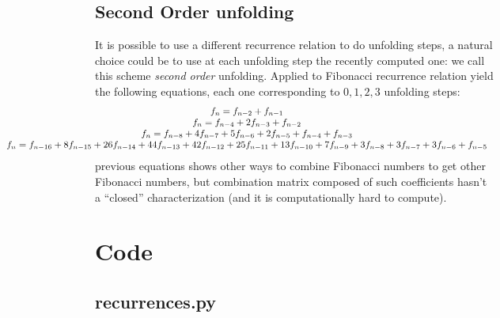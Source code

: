 \documentclass[a4paper,dottedtoc,headinclude,footinclude]{report} %
\theoremstyle{plain}
\begin{document}
    \section{Second Order unfolding}

    It is possible to use a different recurrence relation to do 
    unfolding steps, a natural choice could be to use at each
    unfolding step the recently computed one: we call this scheme
    \emph{second order} unfolding. Applied to Fibonacci recurrence
    relation yield the following equations, each one corresponding
    to $0,1,2,3$ unfolding steps:
    \begin{displaymath}
        \hspace{-3.5cm}
        \begin{array}{c}
             f_{n} = f_{n - 2} + f_{n - 1}\\
             f_{n} = f_{n - 4} + 2 f_{n - 3} + f_{n - 2}\\
             f_{n} = f_{n - 8} + 4 f_{n - 7} + 5 f_{n - 6} + 2 f_{n - 5} + f_{n - 4} + f_{n - 3}\\
             f_{n} = f_{n - 16} + 8 f_{n - 15} + 26 f_{n - 14} + 44 f_{n - 13} + 42 f_{n - 12} + 25 f_{n - 11} + 13 f_{n - 10} + 7 f_{n - 9} + 3 f_{n - 8} + 3 f_{n - 7} + 3 f_{n - 6} + f_{n - 5}\\
        \end{array}
    \end{displaymath}
    previous equations shows other ways to combine Fibonacci numbers
    to get other Fibonacci numbers, but combination matrix composed of
    such coefficients hasn't a ``closed'' characterization 
    (and it is computationally hard to compute).

    \chapter{Code}

    \section{recurrences.py}
    \begin{adjustwidth}{-4cm}{0cm}
        \inputminted{python}{../sympy-notebook/recurrences.py}
    \end{adjustwidth}
\end{document}

